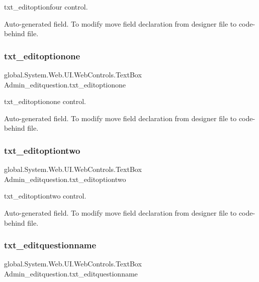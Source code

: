 txt\+\_\+editoptionfour control. 

Auto-\/generated field. To modify move field declaration from designer file to code-\/behind file. \mbox{\label{class_admin__editquestion_a2f4d1c7a0a5e1d1ed5c7661f7e944eec}} 
\subsubsection{\texorpdfstring{txt\_editoptionone}{txt\_editoptionone}}
{\footnotesize\ttfamily global.\+System.\+Web.\+U\+I.\+Web\+Controls.\+Text\+Box Admin\+\_\+editquestion.\+txt\+\_\+editoptionone\hspace{0.3cm}{\ttfamily [protected]}}



txt\+\_\+editoptionone control. 

Auto-\/generated field. To modify move field declaration from designer file to code-\/behind file. \mbox{\label{class_admin__editquestion_a9dd14979b48cbe29113aaada9f94f52d}} 
\subsubsection{\texorpdfstring{txt\_editoptiontwo}{txt\_editoptiontwo}}
{\footnotesize\ttfamily global.\+System.\+Web.\+U\+I.\+Web\+Controls.\+Text\+Box Admin\+\_\+editquestion.\+txt\+\_\+editoptiontwo\hspace{0.3cm}{\ttfamily [protected]}}



txt\+\_\+editoptiontwo control. 

Auto-\/generated field. To modify move field declaration from designer file to code-\/behind file. \mbox{\label{class_admin__editquestion_a777b9c4ca97baf7bfdb2748b10f4f88e}} 
\subsubsection{\texorpdfstring{txt\_editquestionname}{txt\_editquestionname}}
{\footnotesize\ttfamily global.\+System.\+Web.\+U\+I.\+Web\+Controls.\+Text\+Box Admin\+\_\+editquestion.\+txt\+\_\+editquestionname\hspace{0.3cm}{\ttfamily [protected]}}



